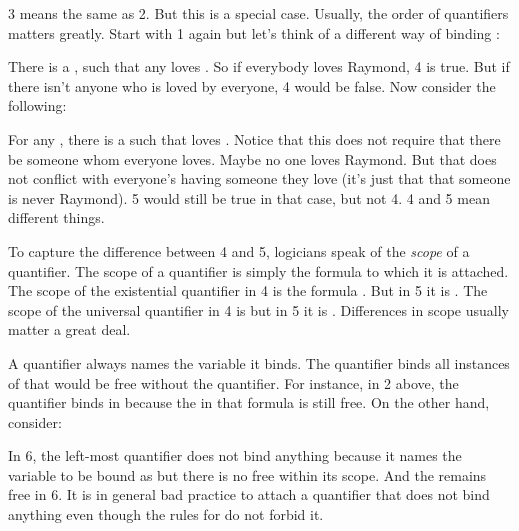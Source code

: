 \begin{argument}
 \aitem {}
\end{argument}

3 means the same as 2. But this is a special case. Usually, the order of 
quantifiers matters greatly. Start with 1 again but let's think of a different 
way of binding :

\begin{argument}
 \aitem {}
\end{argument}

There is a , such that any  loves . So if everybody loves Raymond, 
4 is true. But if there isn't anyone who is loved by everyone, 4 would be false.  
Now consider the following:

\begin{argument}
 \aitem {}
\end{argument}

For any , there is a  such that  loves . Notice that this 
does not require that there be someone whom everyone loves. Maybe no one loves 
Raymond. But that does not conflict with everyone's having someone they love 
(it's just that that someone is never Raymond).  5 would still be true in that 
case, but not 4. 4 and 5 mean different things.

To capture the difference between 4 and 5, logicians speak of the \emph{scope} 
of a quantifier. The scope of a quantifier is simply the formula to which it is 
attached. The scope of the existential quantifier  in 4 is the 
formula . But in 5 it is . The scope of the universal 
quantifier  in 4 is  but in 5 it is .  
Differences in scope usually matter a great deal.

A quantifier always names the variable it binds. The quantifier 
\p{\lforall\upsilon} binds all instances of \p{\upsilon} that would be free 
without the quantifier. For instance, in 2 above, the quantifier  
binds  in  because the  in that formula is still 
free. On the other hand, consider:
\begin{itemize}
 \aitem {}
\end{itemize}
In 6, the left-most quantifier  does not bind anything because it 
names the variable to be bound as  but there is no free  within its 
scope.  And the  remains free in 6. It is in general bad practice to attach 
a quantifier that does not bind anything even though the rules for \lL[Q]{} do 
not forbid it. 

